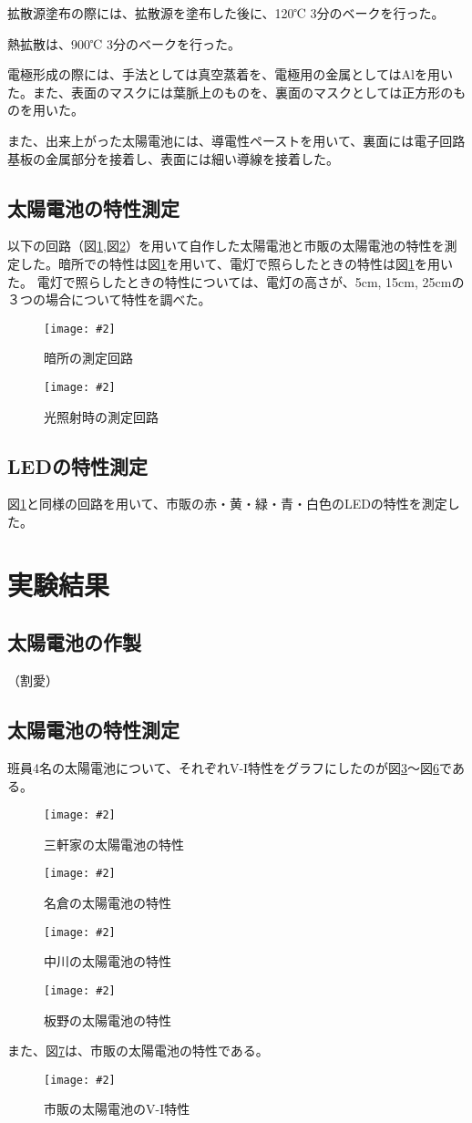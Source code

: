 \documentclass[11pt]{ltjsarticle}
\newcommand{\fg}[3]{
	\begin{figure}
		\texttt{[image: \#2]}
		\caption{#3}
		\label{#1}
	\end{figure}
}
\newcommand{\fr}[1]{図\ref{#1}}
\begin{document}
		拡散源塗布の際には、拡散源を塗布した後に、120℃ 3分のベークを行った。
		
		熱拡散は、900℃ 3分のベークを行った。
		
		電極形成の際には、手法としては真空蒸着を、電極用の金属としてはAlを用いた。また、表面のマスクには葉脈上のものを、裏面のマスクとしては正方形のものを用いた。

		また、出来上がった太陽電池には、導電性ペーストを用いて、裏面には電子回路基板の金属部分を接着し、表面には細い導線を接着した。

	\subsection{太陽電池の特性測定}
		以下の回路（\fr{fig2},\fr{fig3}）を用いて自作した太陽電池と市販の太陽電池の特性を測定した。暗所での特性は\fr{fig2}を用いて、電灯で照らしたときの特性は\fr{fig2}を用いた。
		電灯で照らしたときの特性については、電灯の高さが、5cm, 15cm, 25cmの３つの場合について特性を調べた。
		\fg{fig2}{resources/circuit/dark.png}{暗所の測定回路}
		\fg{fig3}{resources/circuit/light.png}{光照射時の測定回路}

	\subsection{LEDの特性測定}
		\fr{fig2}と同様の回路を用いて、市販の赤・黄・緑・青・白色のLEDの特性を測定した。

\section{実験結果}
	\subsection{太陽電池の作製}
		（割愛）
	\subsection{太陽電池の特性測定}
		\label{sec1}
		班員4名の太陽電池について、それぞれV-I特性をグラフにしたのが\fr{fig4}〜\fr{fig7}である。
		\fg{fig4}{resources/solar/base/sangenya.png}{三軒家の太陽電池の特性}
		\fg{fig5}{resources/solar/base/nagura.png}{名倉の太陽電池の特性}
		\fg{fig6}{resources/solar/base/nakagawa.png}{中川の太陽電池の特性}
		\fg{fig7}{resources/solar/base/itano.png}{板野の太陽電池の特性}

		また、\fr{fig12}は、市販の太陽電池の特性である。
		\fg{fig12}{resources/solar/kadai3/commerce.png}{市販の太陽電池のV-I特性}
\end{document}
